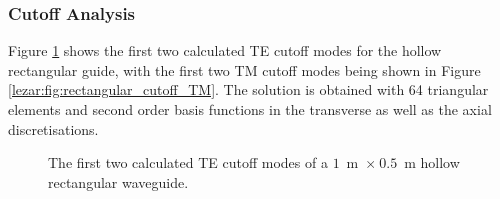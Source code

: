 \subsubsection{Cutoff Analysis}

Figure \ref{lezar:fig:rectangular_cutoff_TE} shows the first two calculated
TE cutoff modes for the hollow rectangular guide, with the first two
TM cutoff modes being shown in Figure
\ref{lezar:fig:rectangular_cutoff_TM}. The solution is obtained with 64
triangular elements and second order basis functions in the transverse
as well as the axial discretisations.
\begin{figure}[ht]
\centering
\caption{The first two calculated TE cutoff modes of a $1$~m~$\times~0.5$~m hollow rectangular waveguide.}
\label{lezar:fig:rectangular_cutoff_TE}
\end{figure}

